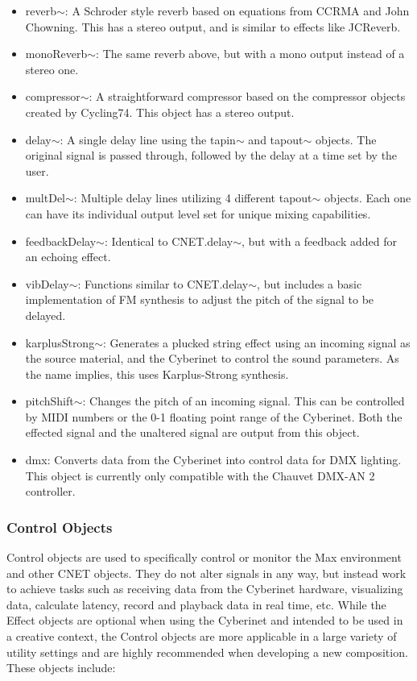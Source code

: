 \begin{itemize}
    \item reverb$\sim$: A Schroder style reverb based on equations from CCRMA and John Chowning. This has a stereo output, and is similar to effects like JCReverb.
    \item monoReverb$\sim$: The same reverb above, but with a mono output instead of a stereo one.
    \item compressor$\sim$: A straightforward compressor based on the compressor objects created by Cycling74. This object has a stereo output.
    \item delay$\sim$: A single delay line using the tapin$\sim$ and tapout$\sim$ objects. The original signal is passed through, followed by the delay at a time set by the user.
    \item multDel$\sim$: Multiple delay lines utilizing 4 different tapout$\sim$ objects. Each one can have its individual output level set for unique mixing capabilities.
    \item feedbackDelay$\sim$: Identical to CNET.delay$\sim$, but with a feedback added for an echoing effect.
    \item vibDelay$\sim$: Functions similar to CNET.delay$\sim$, but includes a basic implementation of FM synthesis to adjust the pitch of the signal to be delayed. 
    \item karplusStrong$\sim$: Generates a plucked string effect using an incoming signal as the source material, and the Cyberinet to control the sound parameters. As the name implies, this uses Karplus-Strong synthesis.
    \item pitchShift$\sim$: Changes the pitch of an incoming signal. This can be controlled by MIDI  numbers or the 0-1 floating point range of the Cyberinet. Both the effected signal and the unaltered signal are output from this object.
    \item dmx: Converts data from the Cyberinet into control data for DMX lighting. This object is currently only compatible with the Chauvet DMX-AN 2 controller.
\end{itemize}


\subsubsection{Control Objects}

Control objects are used to specifically control or monitor the Max environment and other CNET objects. They do not alter signals in any way, but instead work to achieve tasks such as receiving data from the Cyberinet hardware, visualizing data, calculate latency, record and playback data in real time, etc. While the Effect objects are optional when using the Cyberinet and intended to be used in a creative context, the Control objects are more applicable in a large variety of utility settings and are highly recommended when developing a new composition. These objects include:


